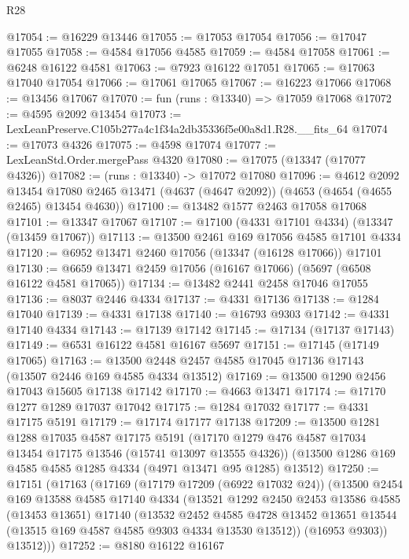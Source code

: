 \begin{lexlean}{R28}
\begin{coremodule}
@17054 := @16229 @13446
@17055 := @17053 @17054
@17056 := @17047 @17055
@17058 := @4584 @17056 @4585
@17059 := @4584 @17058
@17061 := @6248 @16122 @4581
@17063 := @7923 @16122 @17051
@17065 := @17063 @17040 @17054
@17066 := @17061 @17065
@17067 := @16223 @17066
@17068 := @13456 @17067
@17070 := fun (runs : @13340) => @17059 @17068
@17072 := @4595 @2092 @13454
@17073 := LexLeanPreserve.C105b277a4c1f34a2db35336f5e00a8d1.R28.__fits_64
@17074 := @17073 @4326
@17075 := @4598 @17074
@17077 := LexLeanStd.Order.mergePass @4320
@17080 := @17075 (@13347 (@17077 @4326))
@17082 := (runs : @13340) -> @17072 @17080
@17096 := @4612
    @2092
    @13454
    @17080
    @2465
    @13471
    (@4637 (@4647 @2092))
    (@4653 (@4654 (@4655 @2465) @13454 @4630))
@17100 := @13482 @1577 @2463 @17058 @17068
@17101 := @13347 @17067
@17107 := @17100 (@4331 @17101 @4334) (@13347 (@13459 @17067))
@17113 := @13500 @2461 @169 @17056 @4585 @17101 @4334
@17120 := @6952 @13471 @2460 @17056 (@13347 (@16128 @17066)) @17101
@17130 := @6659 @13471 @2459 @17056 (@16167 @17066) (@5697 (@6508 @16122 @4581 @17065))
@17134 := @13482 @2441 @2458 @17046 @17055
@17136 := @8037 @2446 @4334
@17137 := @4331 @17136
@17138 := @1284 @17040
@17139 := @4331 @17138
@17140 := @16793 @9303
@17142 := @4331 @17140 @4334
@17143 := @17139 @17142
@17145 := @17134 (@17137 @17143)
@17149 := @6531 @16122 @4581 @16167 @5697
@17151 := @17145 (@17149 @17065)
@17163 := @13500 @2448 @2457 @4585 @17045 @17136 @17143 (@13507 @2446 @169 @4585 @4334 @13512)
@17169 := @13500 @1290 @2456 @17043 @15605 @17138 @17142
@17170 := @4663 @13471
@17174 := @17170 @1277 @1289 @17037 @17042
@17175 := @1284 @17032
@17177 := @4331 @17175 @5191
@17179 := @17174 @17177 @17138
@17209 := @13500
    @1281
    @1288
    @17035
    @4587
    @17175
    @5191
    (@17170 @1279 @476 @4587 @17034 @13454 @17175 @13546 (@15741 @13097 @13555 @4326))
    (@13500 @1286 @169 @4585 @4585 @1285 @4334 (@4971 @13471 @95 @1285) @13512)
@17250 := @17151
    (@17163
      (@17169
        (@17179 @17209 (@6922 @17032 @24))
        (@13500
          @2454
          @169
          @13588
          @4585
          @17140
          @4334
          (@13521
            @1292
            @2450
            @2453
            @13586
            @4585
            (@13453 @13651)
            @17140
            (@13532
              @2452
              @4585
              @4728
              @13452
              @13651
              @13544
              (@13515 @169 @4587 @4585 @9303 @4334 @13530 @13512))
            (@16953 @9303))
          @13512)))
@17252 := @8180 @16122 @16167

\end{coremodule}
\end{lexlean}
